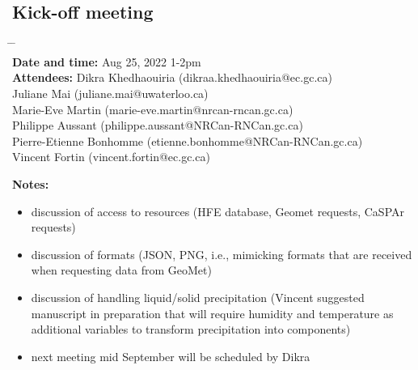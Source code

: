 \documentclass[10pt,a4paper,titlepage,parskip]{scrartcl}
\begin{document}
\subsection{Kick-off meeting}
\vspace*{-0.5cm}
\begin{tabbing}
	\hspace{2.8cm} \= \hspace{4cm} \= \kill \\
	\textbf{Date and time:} 	\> Aug 25, 2022 1-2pm\\
	\textbf{Attendees:} 	\> Dikra Khedhaouiria \> (dikraa.khedhaouiria@ec.gc.ca)\\
							\> Juliane Mai \> (juliane.mai@uwaterloo.ca)\\
							\> Marie-Eve Martin \> (marie-eve.martin@nrcan-rncan.gc.ca)\\
							\> Philippe Aussant \> (philippe.aussant@NRCan-RNCan.gc.ca)\\
	                        \> Pierre-Etienne Bonhomme \> (etienne.bonhomme@NRCan-RNCan.gc.ca)\\
	                        \> Vincent Fortin \> (vincent.fortin@ec.gc.ca)
\end{tabbing}
\vspace*{-0.5cm}
\textbf{Notes:}
\begin{itemize}
	\setlength\itemsep{-0.8em}
	\item discussion of access to resources (HFE database, Geomet requests, CaSPAr requests)
	\item discussion of formats (JSON, PNG, i.e., mimicking formats that are received when requesting data from GeoMet)
	\item discussion of handling liquid/solid precipitation (Vincent suggested manuscript in preparation that will require humidity and temperature as additional variables to transform precipitation into components)
	\item next meeting mid September will be scheduled by Dikra
\end{itemize}
\end{document}
